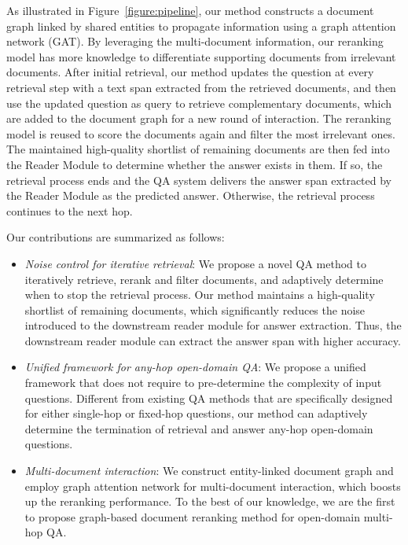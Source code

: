 \documentclass[sigconf]{acmart}
\begin{document}
As illustrated in Figure~\ref{figure:pipeline}, our method constructs a document graph linked by shared entities to propagate information using a graph attention network (GAT). By leveraging the multi-document information, our reranking model has more knowledge to differentiate supporting documents from irrelevant documents. After initial retrieval, our method updates the question at every retrieval step with a text span extracted from the retrieved documents, and then use the updated question as query to retrieve complementary documents, which are added to the document graph for a new round of interaction. The reranking model is reused to score the documents again and filter the most irrelevant ones. The maintained high-quality shortlist of remaining documents are then fed into the Reader Module to determine whether the answer exists in them. If so, the retrieval process ends and the QA system delivers the answer span extracted by the Reader Module as the predicted answer. Otherwise, the retrieval process continues to the next hop.

Our contributions are summarized as follows:
\begin{itemize}[leftmargin=*]
    \item \textit{Noise control for iterative retrieval}: We propose a novel QA method to iteratively retrieve, rerank and filter documents, and adaptively determine when to stop the retrieval process. Our method maintains a high-quality shortlist of remaining documents, which significantly reduces the noise introduced to the downstream reader module for answer extraction. Thus, the downstream reader module can extract the answer span with higher accuracy.
    \item \textit{Unified framework for any-hop open-domain QA}: We propose a unified framework that does not require to pre-determine the complexity of input questions. Different from existing QA methods that are specifically designed for either single-hop or fixed-hop questions, our method can adaptively determine the termination of retrieval and answer any-hop open-domain questions.
    \item \textit{Multi-document interaction}: We construct entity-linked document graph and employ graph attention network for multi-document interaction, which boosts up the reranking performance. To the best of our knowledge, we are the first to propose graph-based document reranking method for open-domain multi-hop QA.
    


\end{itemize}
\end{document}
